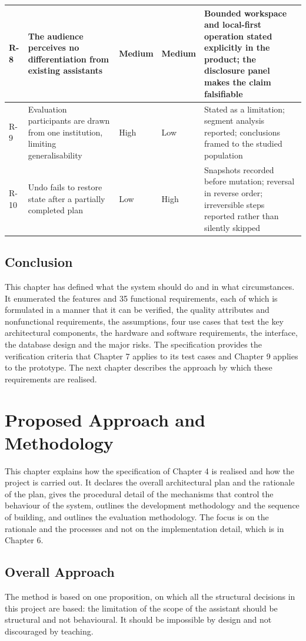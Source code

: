 \documentclass{FastFyp}
\begin{document}
{\begin{longtable}{|p{0.8cm}|p{3.6cm}|p{1.3cm}|p{1.3cm}|p{5.0cm}|}
\hline
R-8 & The audience perceives no differentiation from existing assistants & Medium & Medium & Bounded workspace and local-first operation stated explicitly in the product; the disclosure panel makes the claim falsifiable \\
\hline
R-9 & Evaluation participants are drawn from one institution, limiting generalisability & High & Low & Stated as a limitation; segment analysis reported; conclusions framed to the studied population \\
\hline
R-10 & Undo fails to restore state after a partially completed plan & Low & High & Snapshots recorded before mutation; reversal in reverse order; irreversible steps reported rather than silently skipped \\
\hline
\end{longtable}
}


\section{Conclusion}
This chapter has defined what the system should do and in what circumstances. It enumerated the features and 35 functional requirements, each of which is formulated in a manner that it can be verified, the quality attributes and nonfunctional requirements, the assumptions, four use cases that test the key architectural components, the hardware and software requirements, the interface, the database design and the major risks. The specification provides the verification criteria that Chapter 7 applies to its test cases and Chapter 9 applies to the prototype. The next chapter describes the approach by which these requirements are realised.

\chapter{Proposed Approach and Methodology}
This chapter explains how the specification of Chapter 4 is realised and how the project is carried out. It declares the overall architectural plan and the rationale of the plan, gives the procedural detail of the mechanisms that control the behaviour of the system, outlines the development methodology and the sequence of building, and outlines the evaluation methodology. The focus is on the rationale and the processes and not on the implementation detail, which is in Chapter 6.

\section{Overall Approach}
The method is based on one proposition, on which all the structural decisions in this project are based: the limitation of the scope of the assistant should be structural and not behavioural. It should be impossible by design and not discouraged by teaching.
\end{document}
